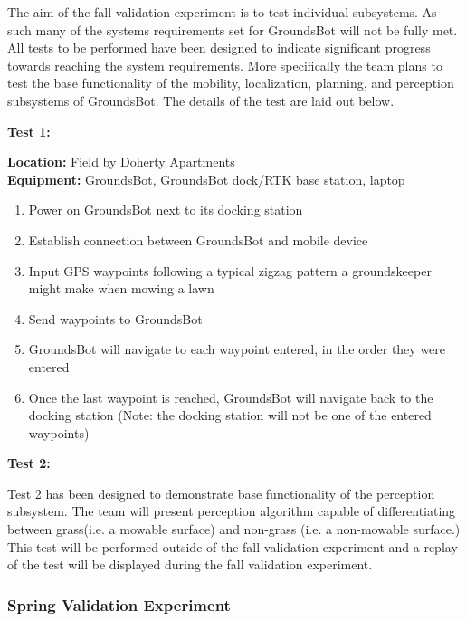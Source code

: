 \documentclass[12pt]{extarticle}
\begin{document}
	The aim of the fall validation experiment is to test individual subsystems. As such many of the systems requirements set for GroundsBot will not be fully met. All tests to be performed have been designed to indicate significant progress towards reaching the system requirements. More specifically the team plans to test the base functionality of the mobility, localization, planning, and perception subsystems of GroundsBot. The details of the test are laid out below.
\\
\begin{center}
\textbf{Test 1:}
\end{center}
\textbf{Location:} Field by Doherty Apartments
\\
\textbf{Equipment:} GroundsBot, GroundsBot dock/RTK base station, laptop
\begin{enumerate}
  \item Power on GroundsBot next to its docking station
  \item Establish connection between GroundsBot and mobile device
  \item Input GPS waypoints following a typical zigzag pattern a groundskeeper might make when mowing a lawn
  \item Send waypoints to GroundsBot
  \item GroundsBot will navigate to each waypoint entered, in the order they were entered
  \item Once the last waypoint is reached, GroundsBot will navigate back to the docking station (Note: the docking station will not be one of the entered waypoints)
\end{enumerate}

\begin{center}
\textbf{Test 2:}
\end{center}
Test 2 has been designed to demonstrate base functionality of the perception subsystem. The team will present perception algorithm capable of differentiating between grass(i.e. a mowable surface) and non-grass (i.e. a non-mowable surface.) This test will be performed outside of the fall validation experiment and a replay of the test will be displayed during the fall validation experiment.

\subsubsection{Spring Validation Experiment}
\end{document}
